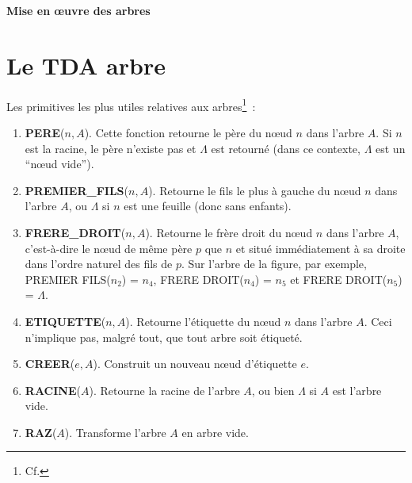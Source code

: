 \label{TDAarbres}
\centerline{\Large\bf Mise en \oe uvre des arbres}

 \noindent\hrulefill  

\section*{Le TDA arbre}

Les primitives les plus utiles relatives aux arbres\footnote{Cf. \pageref{Parcours}}~:

\begin{enumerate}

\item {\bf PERE}($n, A$). Cette fonction retourne le p\`ere du n\oe ud $n$ dans
l'arbre $A$. Si $n$ est la racine, le p\`ere n'existe pas et $\Lambda$
est retourn\'e (dans ce contexte, $\Lambda$ est un ``n\oe ud vide'').

\item {\bf PREMIER\_FILS}($n, A$). Retourne le fils le plus \`a gauche du n\oe ud
	$n$ dans l'arbre $A$, ou $\Lambda$ si $n$ est une feuille
	(donc sans enfants).

\item {\bf FRERE\_DROIT}($n, A$). Retourne le fr\`ere droit du n\oe ud $n$ dans
l'arbre $A$, c'est-\`a-dire le n\oe ud de m\^eme p\`ere $p$ que $n$ et situ\'e
imm\'ediatement \`a sa droite dans l'ordre naturel des fils de $p$. Sur
l'arbre de la figure, %
par exemple, PREMIER FILS($n_{2}$)
= $n_{4}$, FRERE DROIT($n_{4}$) = $n_{5}$ et FRERE DROIT($n_{5}$) =
$\Lambda$.

\item {\bf ETIQUETTE}($n, A$). Retourne l'\'etiquette du n\oe ud $n$ dans l'arbre $A$.
Ceci n'implique pas, malgr\'e tout, que tout arbre soit \'etiquet\'e.


\item {\bf CREER}($e, A$). Construit un nouveau n\oe ud  d'\'etiquette $e$.

\item {\bf RACINE}($A$). Retourne la racine de l'arbre $A$, ou bien $\Lambda$ si $A$ est l'arbre
vide.

\item {\bf RAZ}($A$). Transforme l'arbre $A$ en arbre vide.
\end{enumerate}


